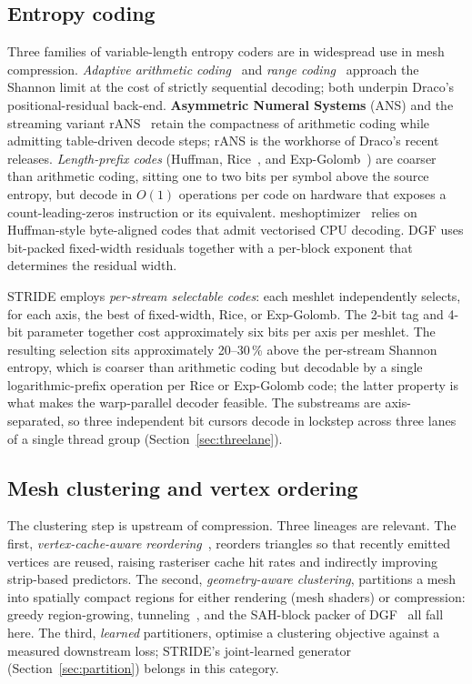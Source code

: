\documentclass[pdflatex,sn-vancouver-num]{sn-jnl}%
\theoremstyle{thmstyleone}%
\theoremstyle{thmstyletwo}%
\theoremstyle{thmstylethree}%
\begin{document}
\subsection{Entropy coding}

Three families of variable-length entropy coders are in widespread use in mesh compression. \emph{Adaptive arithmetic coding}~\cite{ref22_witten_1987} and \emph{range coding}~\cite{ref23_martin_1979} approach the Shannon limit at the cost of strictly sequential decoding; both underpin Draco's positional-residual back-end. \textbf{Asymmetric Numeral Systems} (ANS) and the streaming variant rANS~\cite{ref24_duda_2013_ans} retain the compactness of arithmetic coding while admitting table-driven decode steps; rANS is the workhorse of Draco's recent releases. \emph{Length-prefix codes} (Huffman, Rice~\cite{ref25_rice_plaunt_1971}, and Exp-Golomb~\cite{ref26_teuhola_1978}) are coarser than arithmetic coding, sitting one to two bits per symbol above the source entropy, but decode in $O(1)$ operations per code on hardware that exposes a count-leading-zeros instruction or its equivalent. meshoptimizer~\cite{ref03_meshoptimizer} relies on Huffman-style byte-aligned codes that admit vectorised CPU decoding. DGF uses bit-packed fixed-width residuals together with a per-block exponent that determines the residual width.

STRIDE employs \emph{per-stream selectable codes}: each meshlet independently selects, for each axis, the best of fixed-width, Rice, or Exp-Golomb. The 2-bit tag and 4-bit parameter together cost approximately six bits per axis per meshlet. The resulting selection sits approximately 20--30\,\% above the per-stream Shannon entropy, which is coarser than arithmetic coding but decodable by a single logarithmic-prefix operation per Rice or Exp-Golomb code; the latter property is what makes the warp-parallel decoder feasible. The substreams are axis-separated, so three independent bit cursors decode in lockstep across three lanes of a single thread group (Section~\ref{sec:threelane}).

\subsection{Mesh clustering and vertex ordering}

The clustering step is upstream of compression. Three lineages are relevant. The first, \emph{vertex-cache-aware reordering}~\cite{ref27_hoppe_1999,ref28_forsyth_2006}, reorders triangles so that recently emitted vertices are reused, raising rasteriser cache hit rates and indirectly improving strip-based predictors. The second, \emph{geometry-aware clustering}, partitions a mesh into spatially compact regions for either rendering (mesh shaders) or compression: greedy region-growing, tunneling~\cite{ref11_stewart_2001}, and the SAH-block packer of DGF~\cite{ref01_amd_dgf_hpg2024} all fall here. The third, \emph{learned} partitioners, optimise a clustering objective against a measured downstream loss; STRIDE's joint-learned generator (Section~\ref{sec:partition}) belongs in this category.
\end{document}
